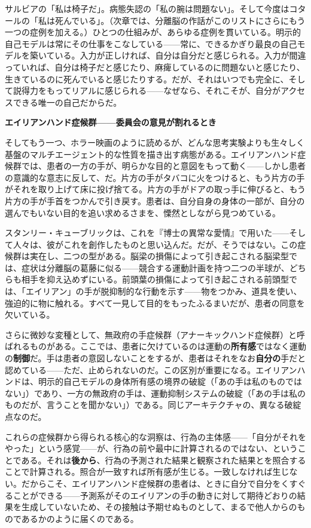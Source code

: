 \documentclass[11pt, twoside, openright]{book}
\begin{document}
サルビアの「私は椅子だ」。病態失認の「私の腕は問題ない」。そして今度はコタールの「私は死んでいる」。（次章では、分離脳の作話がこのリストにさらにもう一つの症例を加える。）ひとつの仕組みが、あらゆる症例を貫いている。明示的自己モデルは常にその仕事をこなしている------常に、できるかぎり最良の自己モデルを築いている。入力が正しければ、自分は自分だと感じられる。入力が間違っていれば、自分は椅子だと感じたり、麻痺しているのに問題ないと感じたり、生きているのに死んでいると感じたりする。だが、それはいつでも完全に、そして説得力をもってリアルに感じられる------なぜなら、それこそが、自分がアクセスできる唯一の自己だからだ。

\textbf{エイリアンハンド症候群------委員会の意見が割れるとき}

そしてもう一つ、ホラー映画のように読めるが、どんな思考実験よりも生々しく基盤のマルチエージェント的な性質を描き出す病態がある。エイリアンハンド症候群では、患者の一方の手が、明らかな目的と意図をもって動く------しかし患者の意識的な意志に反して、だ。片方の手がタバコに火をつけると、もう片方の手がそれを取り上げて床に投げ捨てる。片方の手がドアの取っ手に伸びると、もう片方の手が手首をつかんで引き戻す。患者は、自分自身の身体の一部が、自分の選んでもいない目的を追い求めるさまを、慄然としながら見つめている。

スタンリー・キューブリックは、これを『博士の異常な愛情』で用いた------そして人々は、彼がこれを創作したものと思い込んだ。だが、そうではない。この症候群は実在し、二つの型がある。脳梁の損傷によって引き起こされる脳梁型では、症状は分離脳の葛藤に似る------競合する運動計画を持つ二つの半球が、どちらも相手を抑え込めずにいる。前頭葉の損傷によって引き起こされる前頭型では、「エイリアン」の手が脱抑制的な行動を示す------物をつかみ、道具を使い、強迫的に物に触れる。すべて一見して目的をもったふるまいだが、患者の同意を欠いている。

さらに微妙な変種として、無政府の手症候群（アナーキックハンド症候群）と呼ばれるものがある。ここでは、患者に欠けているのは運動の\textbf{所有感}ではなく運動の\textbf{制御}だ。手は患者の意図しないことをするが、患者はそれをなお\textbf{自分の}手だと認めている------ただ、止められないのだ。この区別が重要になる。エイリアンハンドは、明示的自己モデルの身体所有感の境界の破綻（「あの手は私のものではない」）であり、一方の無政府の手は、運動抑制システムの破綻（「あの手は私のものだが、言うことを聞かない」）である。同じアーキテクチャの、異なる破綻点なのだ。

これらの症候群から得られる核心的な洞察は、行為の主体感------「自分がそれをやった」という感覚------が、行為の前や最中に計算されるのではない、ということである。それは\textbf{後から}、行為の予測された結果と観察された結果とを照合することで計算される。照合が一致すれば所有感が生じる。一致しなければ生じない。だからこそ、エイリアンハンド症候群の患者は、ときに自分で自分をくすぐることができる------予測系がそのエイリアンの手の動きに対して期待どおりの結果を生成していないため、その接触は予期せぬものとして、まるで他人からのものであるかのように届くのである。
\end{document}
